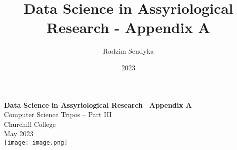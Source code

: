 \documentclass[12pt,a4paper]{report}
\title{Data Science in Assyriological Research - Appendix A}
\author{Radzim Sendyka}
\date{2023}
\begin{document}

\begin{titlepage}
\pagestyle{empty}


\vspace*{60mm}
\begin{center}
\huge
\textbf{Data Science in Assyriological Research --Appendix A} \\[5mm]
Computer Science Tripos -- Part III \\[5mm]
Churchill College \\[5mm]
May 2023
\vspace*{60mm}
\\\texttt{[image: image.png]}
\end{center}
\end{titlepage}

\vspace*{30mm}

\tableofcontents

\pagestyle{headings}



\end{document}
